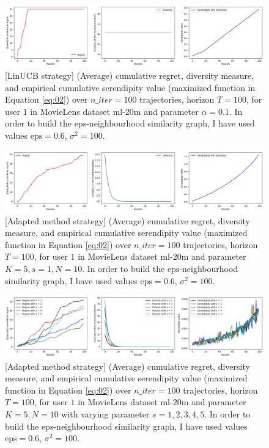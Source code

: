 \documentclass{article}
\begin{document}
\begin{figure}[H]
  \centering
  \includegraphics[scale=0.4]{../Results/ml-20m/linUCB-53sec.png}
  \caption{[LinUCB strategy] (Average) cumulative regret, diversity measure, and empirical cumulative serendipity value (maximized function in Equation \ref{eq:02}) over $n\_iter=100$ trajectories, horizon $T=100$, for user $1$ in MovieLens dataset $\text{ml-20m}$ and parameter $\alpha=0.1$. In order to build the $\text{eps}$-neighbourhood similarity graph, I have used values $\text{eps}=0.6$, $\sigma^{2}=100$.}
\label{figlinUCB}
\end{figure}

\begin{figure}[H]
  \centering
  \includegraphics[scale=0.4]{../Results/ml-20m/lagree-1min49sec.png}
  \caption{[Adapted method strategy] (Average) cumulative regret, diversity measure, and empirical cumulative serendipity value (maximized function in Equation \ref{eq:02}) over $n\_iter=100$ trajectories, horizon $T=100$, for user $1$ in MovieLens dataset $\text{ml-20m}$ and parameter $K=5, s=1, N=10$. In order to build the $\text{eps}$-neighbourhood similarity graph, I have used values $\text{eps}=0.6$, $\sigma^{2}=100$.}
\label{figlagree}
\end{figure}

\begin{figure}[H]
  \centering
  \includegraphics[scale=0.4]{../Results/ml-20m/lagree.png}
  \caption{[Adapted method strategy] (Average) cumulative regret, diversity measure, and empirical cumulative serendipity value (maximized function in Equation \ref{eq:02}) over $n\_iter=100$ trajectories, horizon $T=100$, for user $1$ in MovieLens dataset $\text{ml-20m}$ and parameter $K=5, N=10$ with varying parameter $s=1, 2, 3, 4, 5$. In order to build the $\text{eps}$-neighbourhood similarity graph, I have used values $\text{eps}=0.6$, $\sigma^{2}=100$.}
\label{figlagreecomp}
\end{figure}
\end{document}
